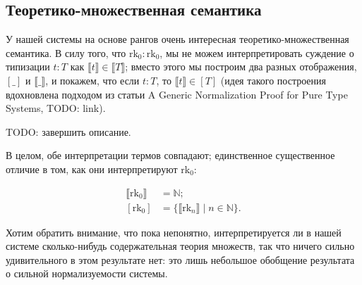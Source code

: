 \subsection{Теоретико-множественная семантика}

У нашей системы на основе рангов очень интересная
теоретико-множественная семантика. В силу того, что
$\mathrm{rk}_0:\mathrm{rk}_0$, мы не можем
интерпретировать суждение о типизации $t:T$ как
$\llbracket t \rrbracket \in \llbracket T \rrbracket$;
вместо этого мы построим два разных отображения, $[\_]$
и $\llbracket\_\rrbracket$, и покажем, что если $t:T$,
то $\llbracket t \rrbracket \in [T]$ (идея такого
построения вдохновлена подходом из статьи A Generic
Normalization Proof for Pure Type Systems, TODO: link).

TODO: завершить описание.

В целом, обе интерпретации термов совпадают;
единственное существенное отличие в том, как они
интерпретируют $\mathrm{rk}_0$:

\begin{align*}
    \llbracket \mathrm{rk}_0 \rrbracket &=
        \mathbb{N}; \\
    [\mathrm{rk}_0] &=
        \{ \llbracket \mathrm{rk}_n \rrbracket \;|\;
            n \in \mathbb{N} \}.
\end{align*}

Хотим обратить внимание, что пока непонятно,
интерпретируется ли в нашей системе сколько-нибудь
содержательная теория множеств, так что ничего сильно
удивительного в этом результате нет: это лишь небольшое
обобщение результата о сильной нормализуемости системы.
